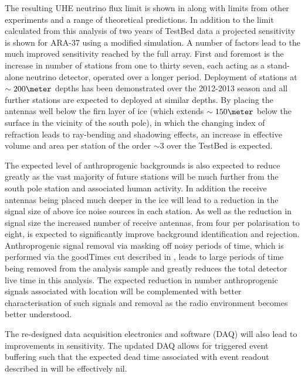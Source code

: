 The resulting UHE neutrino flux limit is shown in  along with limits from other experiments and a range of theoretical predictions. In addition to the limit calculated from this analysis of two years of TestBed data a projected sensitivity is shown for ARA-37 using a modified simulation. A number of factors lead to the much improved sensitivity reached by the full array. First and foremost is the increase in number of stations from one to thirty seven, each acting as a stand-alone neutrino detector, operated over a longer period. Deployment of stations at $\sim 200 \meter$ depths has been demonstrated over the 2012-2013 season and all further stations are expected to deployed at similar depths. By placing the antennas well below the firn layer of ice (which extends $\sim 150 \meter$ below the surface in the vicinity of the south pole), in which the changing index of refraction leads to ray-bending and shadowing effects, an increase in effective volume and area per station of the order $\sim 3$ over the TestBed is expected.

The expected level of anthroprogenic backgrounds is also expected to reduce greatly as the vast majority of future stations will be much further from the south pole station and associated human activity. In addition the receive antennas being placed much deeper in the ice will lead to a reduction in the signal size of above ice noise sources in each station. As well as the reduction in signal size the increased number of receive antennas, from four per polarisation to eight, is expected to significantly improve background identification and rejection. Anthroprogenic signal removal via masking off noisy periods of time, which is performed via the goodTimes cut described in , leads to large periods of time being removed from the analysis sample and greatly reduces the total detector live time in this analysis. The expected reduction in number anthroprogenic signals associated with location will be complemented with better characterisation of such signals and removal as the radio environment becomes better understood.

The re-designed data acquisition electronics and software (DAQ) will also lead to improvements in sensitivity. The updated DAQ allows for triggered event buffering such that the expected dead time associated with event readout described in  will be effectively nil. 







